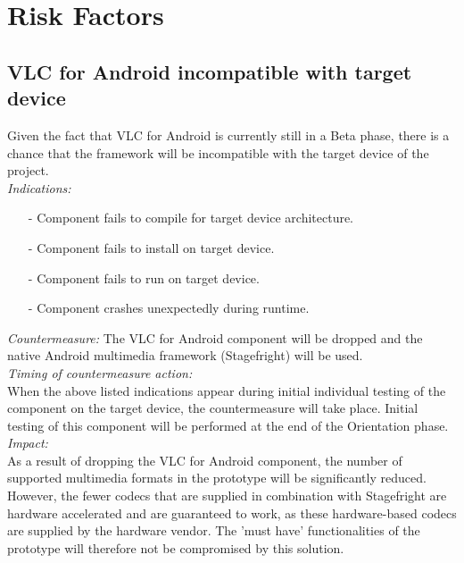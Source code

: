 \section{Risk Factors}
\subsection{VLC for Android incompatible with target device}
Given the fact that VLC for Android is currently still in a Beta phase, there is a chance that the framework will be incompatible with the target device of the project.\\
\newline
\textit{Indications:}
\begin{itemize}
	\item[-]Component fails to compile for target device architecture.
	\item[-]Component fails to install on target device.
	\item[-]Component fails to run on target device.
	\item[-]Component crashes unexpectedly during runtime.
	\\
\end{itemize}
\textit{Countermeasure:}
\newline
The VLC for Android component will be dropped and the native Android multimedia framework (Stagefright) will be used.\\
\newline
\textit{Timing of countermeasure action:}\\
When the above listed indications appear during initial individual testing of the component on the target device, the countermeasure will take place. Initial testing of this component will be performed at the end of the Orientation phase.\\
\newline
\newline
\textit{Impact:}\\
As a result of dropping the VLC for Android component, the number of supported multimedia formats in the prototype will be significantly reduced. However, the fewer codecs that are supplied in combination with Stagefright are hardware accelerated and are guaranteed to work, as these hardware-based codecs are supplied by the hardware vendor. The 'must have' functionalities of the prototype will therefore not be compromised by this solution.\\
